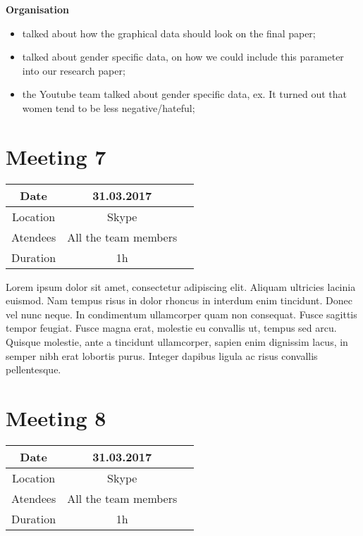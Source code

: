  \textbf{Organisation}
 \begin{itemize}
	\item talked about how the graphical data should look on the final paper;
	\item talked about gender specific data, on how we could include this parameter into our research paper;
	\item the Youtube team talked about gender specific data, ex. It turned out that women tend to be less negative/hateful;
 \end{itemize}


\section{Meeting 7}
\begin{center}
	\begin{tabular}{| c | c | c }
		\hline
		Date &	31.03.2017   \\
		\hline
		Location & Skype  \\
		\hline
		Atendees & All the team members   \\
		\hline
		Duration & 1h  \\
		\hline
	\end{tabular}
\end{center}


Lorem ipsum dolor sit amet, consectetur adipiscing elit. Aliquam ultricies lacinia euismod. Nam tempus risus in dolor rhoncus in interdum enim tincidunt. Donec vel nunc neque. In condimentum ullamcorper quam non consequat. Fusce sagittis tempor feugiat. Fusce magna erat, molestie eu convallis ut, tempus sed arcu. Quisque molestie, ante a tincidunt ullamcorper, sapien enim dignissim lacus, in semper nibh erat lobortis purus. Integer dapibus ligula ac risus convallis pellentesque.

\section{Meeting 8}
\begin{center}
	\begin{tabular}{| c | c | c }
		\hline
		Date &  31.03.2017   \\
		\hline
		Location & Skype  \\
		\hline
		Atendees & All the team members   \\
		\hline
		Duration & 1h  \\
		\hline
	\end{tabular}
\end{center}


